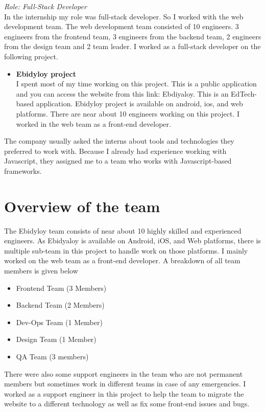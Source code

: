 \setcounter{section}{0} 

\begin{flushleft}
\textcolor[rgb]{0,0.690,0.941}{\textit{Role: Full-Stack Developer}}\\
\vspace{5pt}
In the internship my role was full-stack developer. So I worked with
the web development team. The web development team consisted of 10 engineers. 3 engineers from the frontend team, 3 engineers from the backend team, 2 engineers from the design team and 2 team
leader. I worked as a full-stack developer on the following project.\\
\vspace{5pt}
\begin{itemize}
    \item  \textbf{Ebidyloy project}\\
    \vspace{2pt}
    I spent most of my time working on this project. This is a public application and you can
access the website from this link: Ebdiyaloy. This is an EdTech-based application.
Ebidyloy project is available on android, ios, and web platforms. There are near about 10
engineers working on this project. I worked in the web team as a front-end developer.
    
\end{itemize}

The company usually asked the interns about tools and technologies they preferred to work
with. Because I already had experience working with Javascript, they assigned me to a team
who works with Javascript-based frameworks.

\end{flushleft}


\section{Overview of the team}
\begin{flushleft}
    The Ebidyloy team consists of near about 10 highly skilled and experienced engineers. As
Ebidyaloy is available on Android, iOS, and Web platforms, there is multiple sub-team in this
project to handle work on those platforms. I mainly worked on the web team as a front-end
developer. A breakdown of all team members is given below
\begin{itemize}
    \item Frontend Team (3 Members)
\item Backend Team (2 Members)
\item Dev-Ops Team (1 Member)
\item Design Team (1 Member)
\item QA Team (3 members)
\end{itemize}

There were also some support engineers in the team who are not permanent members but
sometimes work in different teams in case of any emergencies.
I worked as a support engineer in this project to help the team to migrate the website to a
different technology as well as fix some front-end issues and bugs.
\end{flushleft}


